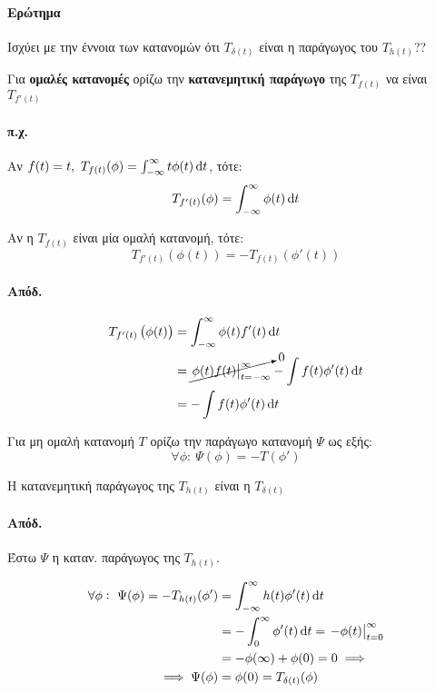 \documentclass[11pt,a4paper,titlepage,final]{article}
\begin{document}
\paragraph{Ερώτημα} Ισχύει με την έννοια των κατανομών ότι \( T_{\delta(t)} \) είναι η παράγωγος του \( T_{h(t)} \)??

\begin{defn}{}{}
Για \textbf{ομαλές κατανομές} ορίζω την \textbf{κατανεμητική παράγωγο} της \( T_{f(t)} \) να είναι \( T_{f'(t)} \)
\end{defn}
\paragraph{π.χ.} Αν \( f(t)=t,\ T_{f(t)}(\phi) = \int_{-\infty}^\infty t\phi(t)\dif t \), τότε:
\[
T_{f'(t)}(\phi) = \int_{-\infty}^\infty \phi(t)\dif t
\]

\begin{theorem}{}{}
Αν η \( T_{f(t)} \) είναι μία ομαλή κατανομή, τότε:
\[
T_{f'(t)}\left(\phi(t)\right) = -T_{f(t)}\left(\phi'(t) \right)
\]
\end{theorem}
\paragraph{Απόδ.}
\begin{align*}
T_{f'(t)}\left(\phi(t) \right) &= \int_{-\infty}^\infty\phi(t)f'(t)\dif t \\
&= \cancelto{0}{\left. \phi(t) f(t) \right|_{t=-\infty}^\infty} - \int f(t)\phi'(t) \dif t \\
&=- \int f(t)\phi'(t) \dif t
\end{align*}

\begin{defn}{}{}
Για μη ομαλή κατανομή \( T \) ορίζω την παράγωγο κατανομή \( \Psi \) ως εξής:
\[
\forall \phi: \ \Psi(\phi) = -T(\phi')
\]
\end{defn}

\begin{theorem}{}{}
Η κατανεμητική παράγωγος της \( T_{h(t)} \) είναι η \( T_{\delta(t)} \)
\end{theorem}
\paragraph{Απόδ.}
Έστω \( \Psi \) η καταν. παράγωγος της \( T_{h(t)} \).

\begin{align*}
\forall \phi:\ \Psi(\phi) = - T_{h(t)}(\phi') &=
\int_{-\infty}^\infty h(t) \phi'(t) \dif t
\\ &= - \int_0^\infty \phi'(t)\dif t = \left. -\phi(t) \right|_{t=0}^\infty
\\ &= -\phi(\infty) + \phi(0) = 0 \implies \\
\implies \Psi(\phi) &= \phi(0) = T_{\delta(t)}(\phi)
 \end{align*}
\end{document}
